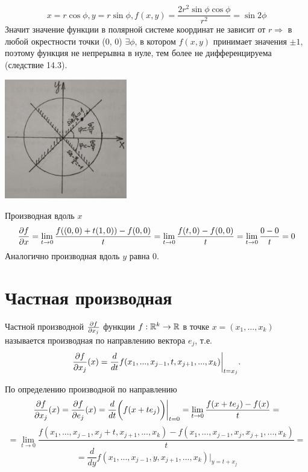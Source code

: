     \begin{explanation}
    	 \[ x = r \cos{\phi}, y = r \sin{\phi}, f(x, y) = \frac{2r^2 \sin{\phi} \cos{\phi}}{r^2} = \sin{2\phi} \]
    	 Значит значение функции в полярной системе координат не зависит от $r \Rightarrow$ в любой окрестности точки (0, 0) $\exists \phi$, в котором $f(x, y)$ принимает значения $\pm 1$, поэтому функция не непрерывна в нуле, тем более не дифференцируема (следствие 14.3).
    	 \begin{center}
    	 	\includegraphics[width=0.4\textwidth]{img/lecture36/polar}
    	 \end{center}
    	 Производная вдоль $x$
    	 \[ \frac{\partial f}{\partial x} = \lim_{t \to 0} \frac{f((0, 0) + t(1, 0)) - f(0, 0)}{t} = \lim_{t \to 0} \frac{f(t, 0) - f(0, 0)}{t} = \lim_{t \to 0} \frac{0 - 0}{t} = 0 \]
    	 Аналогично производная вдоль $y$ равна 0.
    \end{explanation}
    
    \section{Частная производная}
    
    \begin{definition}
    	Частной производной $\frac{\partial f}{\partial x_j}$ функции $f : \mathbb R^k \rightarrow \mathbb R$ в точке $x = (x_1, ..., x_k)$ называется производная по направлению вектора $e_j$, т.е.
    	\[ \frac{\partial f}{\partial x_j}(x) = \frac{d}{dt} f(x_1, ..., x_{j - 1}, t, x_{j + 1}, ..., x_k) \bigg|_{t = x_j}. \]
    \end{definition}
    
    \begin{explanation}
    	По определению производной по направлению 
    	\[ \frac{\partial f}{\partial x_j}(x) = \frac{\partial f}{\partial e_j}(x) = \frac{d}{dt}\bigg(f(x + te_j)\bigg) \bigg|_{t = 0} = \lim_{t \to 0} \frac{f(x + te_j) - f(x)}{t} = \]
    	\[ = \lim_{t \to 0} \frac{f(x_1, ..., x_{j - 1}, x_j + t, x_{j + 1}, ..., x_k) - f(x_1, ..., x_{j - 1}, x_j, x_{j + 1}, ..., x_k)}{t} = \]
    	\[ = \frac{d}{dy} f(x_1, ..., x_{j - 1}, y, x_{j + 1}, ..., x_k) \bigg|_{y = t + x_j} \]
    \end{explanation}
    
